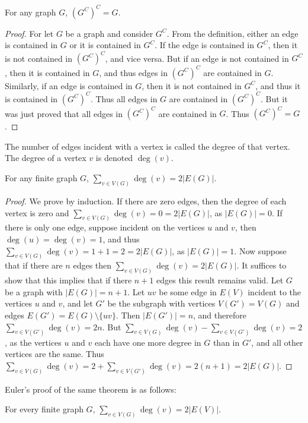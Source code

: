 \documentclass[crop=false,class=book,oneside]{standalone}
\begin{document}
\begin{theorem}
For any graph $G$, $(G^C)^C = G$.
\end{theorem}
\begin{proof}
For let $G$ be a graph and consider $G^C$. From the definition, either an edge is contained in $G$ or it is contained in $G^C$. If the edge is contained in $G^C$, then it is not contained in $(G^C)^C$, and vice versa. But if an edge is not contained in $G^C$, then it is contained in $G$, and thus edges in $(G^C)^C$ are contained in $G$. Similarly, if an edge is contained in $G$, then it is not contained in $G^C$, and thus it is contained in $(G^C)^C$. Thus all edges in $G$ are contained in $(G^C)^C$. But it was just proved that all edges in $(G^C)^C$ are contained in $G$. Thus $(G^C)^C = G$.
\end{proof}
\begin{definition}
The number of edges incident with a vertex is called the degree of that vertex. The degree of a vertex $v$ is denoted $\deg(v)$.
\end{definition}
\begin{theorem}
For any finite graph $G$, $\sum_{v\in V(G)} \deg(v) = 2|E(G)|$.
\end{theorem}
\begin{proof}
We prove by induction. If there are zero edges, then the degree of each vertex is zero and $\sum_{v\in V(G)}\deg(v) = 0 = 2|E(G)|$, as $|E(G)| = 0$. If there is only one edge, suppose incident on the vertices $u$ and $v$, then $\deg(u) = \deg(v) = 1$, and thus $\sum_{v\in V(G)} \deg(v) = 1+1 = 2 = 2|E(G)|$, as $|E(G)| = 1$. Now suppose that if there are $n$ edges then $\sum_{v\in V(G)}\deg(v) = 2|E(G)|$. It suffices to show that this implies that if there $n+1$ edges this result remains valid. Let $G$ be a graph with $|E(G)| = n+1$. Let $uv$ be some edge in $E(V)$ incident to the vertices $u$ and $v$, and let $G'$ be the subgraph with vertices $V(G') = V(G)$ and edges $E(G')=E(G)\setminus \{uv\}$. Then $|E(G')| = n$, and therefore $\sum_{v\in V(G')}\deg(v) = 2n$. But $\sum_{v\in V(G)} \deg(v) - \sum_{v\in V(G')}\deg(v) = 2$, as the vertices $u$ and $v$ each have one more degree in $G$ than in $G'$, and all other vertices are the same. Thus $\sum_{v\in V(G)}\deg(v) = 2 + \sum_{v\in V(G')}\deg(v) = 2(n+1) = 2|E(G)|$.
\end{proof}
Euler's proof of the same theorem is as follows:
\begin{theorem}
For every finite graph $G$, $\sum_{v\in V(G)}\deg(v) = 2|E(V)|$.
\end{theorem}
\end{document}

